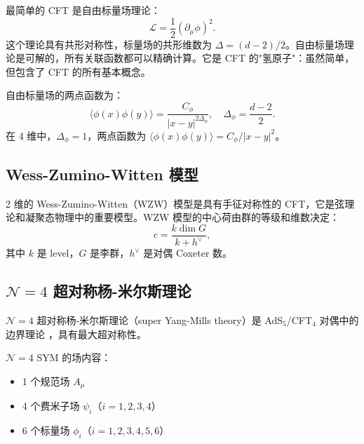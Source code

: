 \begin{example}
最简单的 CFT 是自由标量场理论：
\begin{equation}
    \mathcal{L} = \frac{1}{2}(\partial_\mu \phi)^2.
\end{equation}
这个理论具有共形对称性，标量场的共形维数为 $\Delta = (d-2)/2$。自由标量场理论是可解的，所有关联函数都可以精确计算。它是 CFT 的"氢原子"：虽然简单，但包含了 CFT 的所有基本概念。

自由标量场的两点函数为：
\begin{equation}
    \langle \phi(x) \phi(y) \rangle = \frac{C_\phi}{|x-y|^{2\Delta_\phi}}, \quad \Delta_\phi = \frac{d-2}{2}.
\end{equation}
在 4 维中，$\Delta_\phi = 1$，两点函数为 $\langle \phi(x) \phi(y) \rangle = C_\phi/|x-y|^2$。
\end{example}

\subsection{Wess-Zumino-Witten 模型}

\begin{example}[WZW 模型]
2 维的 Wess-Zumino-Witten（WZW）模型是具有手征对称性的 CFT，它是弦理论和凝聚态物理中的重要模型。WZW 模型的中心荷由群的等级和维数决定：
\begin{equation}
    c = \frac{k \dim G}{k + h^\vee},
\end{equation}
其中 $k$ 是 level，$G$ 是李群，$h^\vee$ 是对偶 Coxeter 数。
\end{example}

\subsection{$\mathcal{N}=4$ 超对称杨-米尔斯理论}

\begin{definition}[$\mathcal{N}=4$ SYM]
$\mathcal{N}=4$ 超对称杨-米尔斯理论（super Yang-Mills theory）是 AdS$_5$/CFT$_4$ 对偶中的边界理论 \cite{Maldacena1997}，具有最大超对称性。

$\mathcal{N}=4$ SYM 的场内容：
\begin{itemize}
    \item 1 个规范场 $A_\mu$
    \item 4 个费米子场 $\psi_i$（$i=1,2,3,4$）
    \item 6 个标量场 $\phi_i$（$i=1,2,3,4,5,6$）
\end{itemize}
\end{definition}


